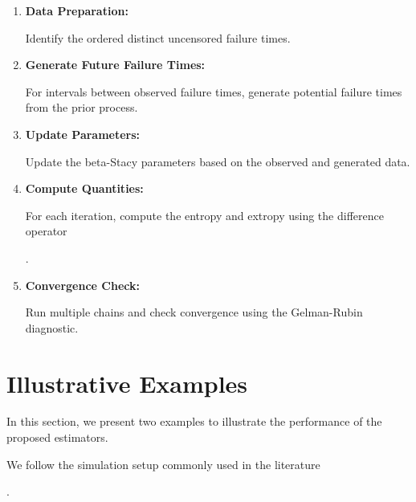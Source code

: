 \documentclass[10pt,twoside]{article}
\numberwithin{equation}{section}
\begin{document}
\begin{enumerate}

\item

\textbf{Data Preparation:}

Identify the ordered distinct uncensored failure times. 

\item

\textbf{Generate Future Failure Times:}

For intervals between observed failure times, generate potential failure times from the prior process. 

\item

\textbf{Update Parameters:}

Update the beta-Stacy parameters based on the observed and generated data. 

\item

\textbf{Compute Quantities:}

For each iteration, compute the entropy and extropy using the difference operator

\citep{7}. 

\item

\textbf{Convergence Check:}

Run multiple chains and check convergence using the Gelman-Rubin diagnostic. 

\end{enumerate}





\section{Illustrative Examples}

In this section, we present two examples to illustrate the performance of the proposed estimators. 

We follow the simulation setup commonly used in the literature 

\citep{3,13}. 
\end{document}
